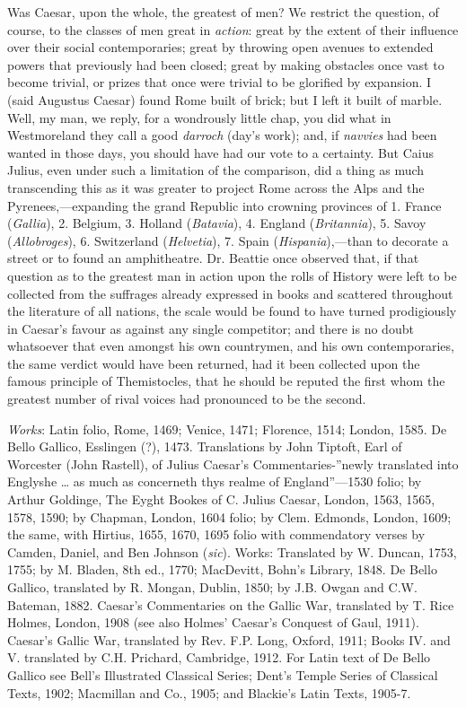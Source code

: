 Was Caesar, upon the whole, the greatest of men? We restrict the
question, of course, to the classes of men great in \emph{action}: great by
the extent of their influence over their social contemporaries; great by
throwing open avenues to extended powers that previously had been
closed; great by making obstacles once vast to become trivial, or prizes
that once were trivial to be glorified by expansion. I (said Augustus
Caesar) found Rome built of brick; but I left it built of marble. Well,
my man, we reply, for a wondrously little chap, you did what in
Westmoreland they call a good \emph{darroch} (day's work); and, if \emph{navvies}
had been wanted in those days, you should have had our vote to a
certainty. But Caius Julius, even under such a limitation of the
comparison, did a thing as much transcending this as it was greater to
project Rome across the Alps and the Pyrenees,—expanding the grand
Republic into crowning provinces of 1. France (\emph{Gallia}), 2. Belgium, 3.
Holland (\emph{Batavia}), 4. England (\emph{Britannia}), 5. Savoy (\emph{Allobroges}),
6. Switzerland (\emph{Helvetia}), 7. Spain (\emph{Hispania}),—than to decorate a
street or to found an amphitheatre. Dr. Beattie once observed that, if
that question as to the greatest man in action upon the rolls of History
were left to be collected from the suffrages already expressed in books
and scattered throughout the literature of all nations, the scale would
be found to have turned prodigiously in Caesar's favour as against any
single competitor; and there is no doubt whatsoever that even amongst
his own countrymen, and his own contemporaries, the same verdict would
have been returned, had it been collected upon the famous principle of
Themistocles, that he should be reputed the first whom the greatest
number of rival voices had pronounced to be the second.

\emph{Works}: Latin folio, Rome, 1469; Venice, 1471; Florence, 1514; London,
1585. De Bello Gallico, Esslingen (?), 1473. Translations by John
Tiptoft, Earl of Worcester (John Rastell), of Julius Caesar's
Commentaries-''newly translated into Englyshe … as much as concerneth
thys realme of England''—1530 folio; by Arthur Goldinge, The Eyght
Bookes of C. Julius Caesar, London, 1563, 1565, 1578, 1590; by Chapman,
London, 1604 folio; by Clem. Edmonds, London, 1609; the same, with
Hirtius, 1655, 1670, 1695 folio with commendatory verses by Camden,
Daniel, and Ben Johnson (\emph{sic}). Works: Translated by W. Duncan, 1753,
1755; by M. Bladen, 8th ed., 1770; MacDevitt, Bohn's Library, 1848. De
Bello Gallico, translated by R. Mongan, Dublin, 1850; by J.B. Owgan and
C.W. Bateman, 1882. Caesar's Commentaries on the Gallic War, translated
by T. Rice Holmes, London, 1908 (see also Holmes' Caesar's Conquest of
Gaul, 1911). Caesar's Gallic War, translated by Rev. F.P. Long, Oxford,
1911; Books IV. and V. translated by C.H. Prichard, Cambridge, 1912. For
Latin text of De Bello Gallico see Bell's Illustrated Classical Series;
Dent's Temple Series of Classical Texts, 1902; Macmillan and Co., 1905;
and Blackie's Latin Texts, 1905-7.

